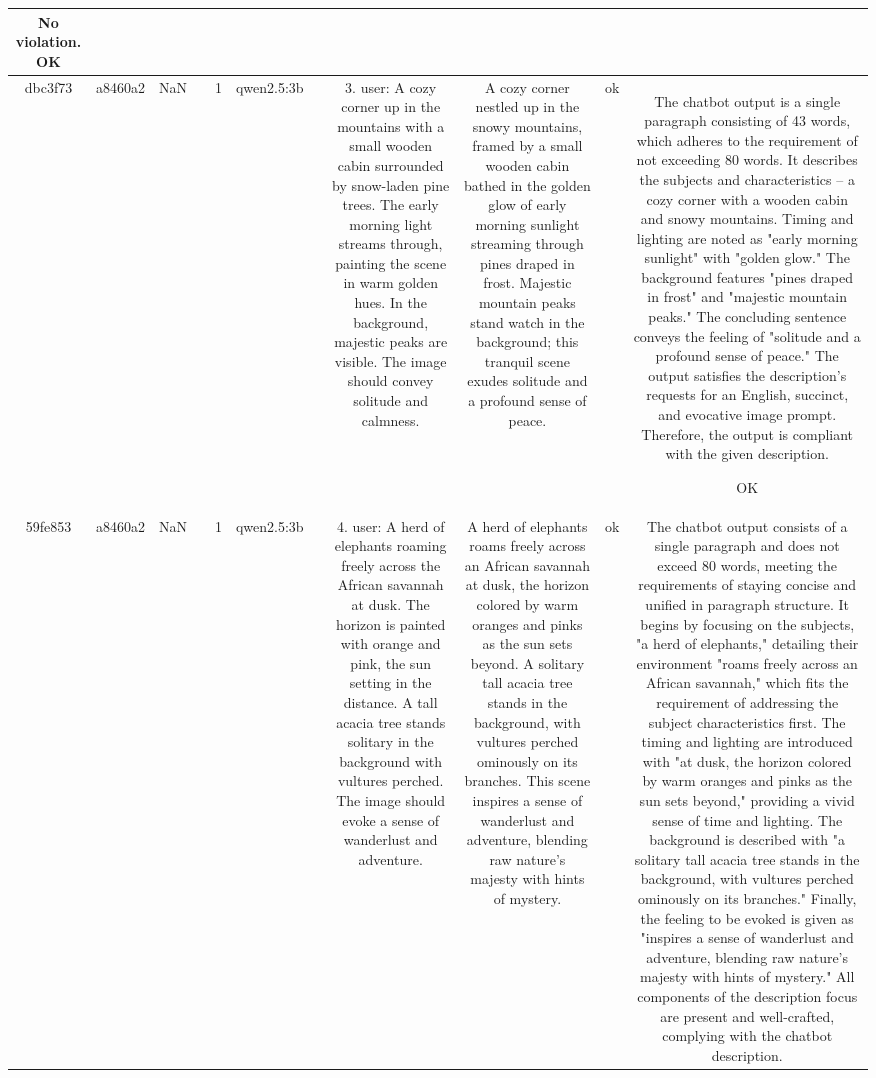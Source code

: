 \begin{table}[h!]
\begin{tabular}{|c|c|c|c|c|c|c|c|c|c|c|}
No violation.
OK\\
\hline
dbc3f73 & a8460a2 & NaN &  & 1 & qwen2.5:3b &  & 3. user: A cozy corner up in the mountains with a small wooden cabin surrounded by snow-laden pine trees. The early morning light streams through, painting the scene in warm golden hues. In the background, majestic peaks are visible. The image should convey solitude and calmness. & A cozy corner nestled up in the snowy mountains, framed by a small wooden cabin bathed in the golden glow of early morning sunlight streaming through pines draped in frost. Majestic mountain peaks stand watch in the background; this tranquil scene exudes solitude and a profound sense of peace. & ok & The chatbot output is a single paragraph consisting of 43 words, which adheres to the requirement of not exceeding 80 words. It describes the subjects and characteristics – a cozy corner with a wooden cabin and snowy mountains. Timing and lighting are noted as "early morning sunlight" with "golden glow." The background features "pines draped in frost" and "majestic mountain peaks." The concluding sentence conveys the feeling of "solitude and a profound sense of peace." The output satisfies the description's requests for an English, succinct, and evocative image prompt. Therefore, the output is compliant with the given description.

OK\\
\hline
59fe853 & a8460a2 & NaN &  & 1 & qwen2.5:3b &  & 4. user: A herd of elephants roaming freely across the African savannah at dusk. The horizon is painted with orange and pink, the sun setting in the distance. A tall acacia tree stands solitary in the background with vultures perched. The image should evoke a sense of wanderlust and adventure. & A herd of elephants roams freely across an African savannah at dusk, the horizon colored by warm oranges and pinks as the sun sets beyond. A solitary tall acacia tree stands in the background, with vultures perched ominously on its branches. This scene inspires a sense of wanderlust and adventure, blending raw nature's majesty with hints of mystery. & ok & The chatbot output consists of a single paragraph and does not exceed 80 words, meeting the requirements of staying concise and unified in paragraph structure. It begins by focusing on the subjects, "a herd of elephants," detailing their environment "roams freely across an African savannah," which fits the requirement of addressing the subject characteristics first. The timing and lighting are introduced with "at dusk, the horizon colored by warm oranges and pinks as the sun sets beyond," providing a vivid sense of time and lighting. The background is described with "a solitary tall acacia tree stands in the background, with vultures perched ominously on its branches." Finally, the feeling to be evoked is given as "inspires a sense of wanderlust and adventure, blending raw nature's majesty with hints of mystery." All components of the description focus are present and well-crafted, complying with the chatbot description.


\end{tabular}
\end{table}
